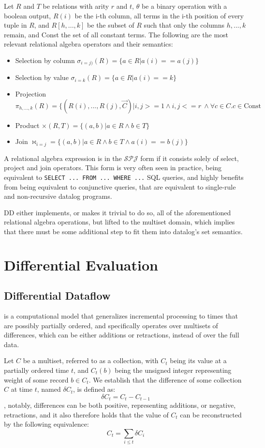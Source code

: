 \documentclass[sigconf,screen,review,natbib]{acmart}
\theoremstyle{definition}
\begin{document}
Let $R$ and $T$ be relations with arity $r$ and $t$, $\theta$ be a binary operation with a boolean output, $R(i)$ be
the i-th column, all terms in the i-th position of every tuple in $R$, and $R[h, ..., k]$ be the subset of $R$ such
that only the columns $h, ..., k$ remain, and Const the set of all constant terms. The following are the most
relevant relational algebra operators and their semantics:
\begin{itemize}
	\item Selection by column $\sigma_{i=j)}(R) = \{ a \in R | a(i) == a(j) \}$
	\item Selection by value $\sigma_{i=k}(R) = \{a \in R | a(i) == k \}$
	\item Projection $\pi_{h, ..., k}(R) = \{(R(i), ..., R(j), \overrightarrow{C}) |  i, j >= 1 \wedge i, j <= r\ \wedge \forall c \in C. c \in \text{Const}$
	\item Product $\times(R, T) = \{(a, b) | a \in R \wedge b \in T \}$
	\item Join $\Join_{i=j} = \{(a, b) | a \in R \wedge b \in T \wedge a(i) == b(j)\}$
\end{itemize}
A relational algebra expression is in the $\mathcal{SPJ}$ form if it consists solely of select, project and join
operators. This form is very often seen in practice, being equivalent to \verb|SELECT ... FROM ... WHERE ...| SQL
queries, and highly benefits from being equivalent to conjunctive queries, that are equivalent to single-rule and
non-recursive datalog programs.

DD either implements, or makes it trivial to do so, all of the aforementioned relational algebra
operations, but lifted to the multiset domain, which implies that there must be some additional step to fit them
into datalog's set semantics.

\section{Differential Evaluation}
\subsection{Differential Dataflow} is a computational model that generalizes incremental processing to
times that are possibly partially ordered, and specifically operates over multisets of differences, which
can be either additions or retractions, instead of over the full data.

Let $C$ be a multiset, referred to as a collection, with $C_t$ being its value at a partially ordered
time $t$, and $C_t(b)$ being the unsigned integer representing weight of some record $b \in C_t$. We
establish that the difference of some collection $C$ at time $t$, named $\delta C_t$, is defined as: \[\delta C_t = C_t - C_{t - 1}\],
notably, differences can be both positive, representing additions, or negative, retractions, and it
also therefore holds that the value of $C_t$ can be reconstructed by the following equivalence: \[C_t = \sum_{i \leq t}\delta C_{i}\]
\end{document}
